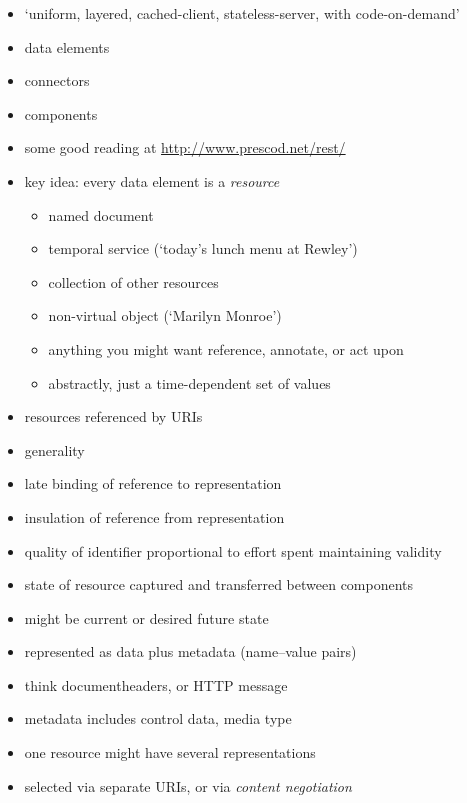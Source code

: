\documentclass{sepslide-soa-faked} %
\begin{document}
\begin{slide}
\begin{itemize}
\item `uniform, layered, cached-client, stateless-server, with code-on-demand'
\item data elements
\item connectors
\item components
\bigskip
\item some good reading at \url{http://www.prescod.net/rest/}
\end{itemize}
\end{slide}

\begin{slide}
\begin{itemize}
\item key idea: every data element is a \emph{resource}
\begin{itemize}
\item named document
\item temporal service (`today's lunch menu at Rewley')
\item collection of other resources
\item non-virtual object (`Marilyn Monroe')
\item anything you might want reference, annotate, or act upon
\item abstractly, just a time-dependent set of values
\end{itemize}
\item resources referenced by URIs
\item generality
\item late binding of reference to representation
\item insulation of reference from representation
\item quality of identifier proportional to effort spent maintaining validity
\end{itemize}
\end{slide}

\begin{slide}
\begin{itemize}
\item state of resource captured and transferred between components
\item might be current or desired future state
\item represented as data plus metadata (name--value pairs)
\item think document\maths{+}headers, or HTTP message
\item metadata includes control data, media type
\item one resource might have several representations
\item selected via separate URIs, or via \emph{content negotiation}
\end{itemize}
\end{slide}
\end{document}
